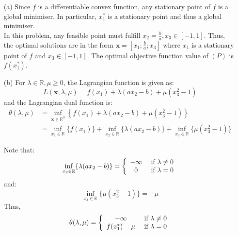 \documentclass{article}
\begin{document}
\begin{itemize}
    \item[(a)] Since $f$ is a differentiable convex function, any stationary point of $f$ is a global minimiser. In particular, $x_1^*$ is a stationary point and thus a global minimiser. \\
    In this problem, any feasible point must fulfill $x_2 = \frac ba, x_3 \in [-1,1]$. Thus, the optimal solutions are in the form $\mathbf{x} = \left[x_1; \frac ba; x_3\right]$ where $x_1$ is a stationary point of $f$ and $x_3\in[-1,1]$. The optimal objective function value of $(P)$ is $f(x_1^*)$.
    \item[(b)] For $\lambda \in \mathbb{R}, \mu\geq0$, the Lagrangian function is given as:\[L(\mathbf{x},\lambda,\mu) = f(x_1) + \lambda (ax_2 -b) + \mu(x_3^2-1)\] and the Lagrangian dual function is:\begin{align*}
        \theta(\lambda, \mu) &= \inf_{\mathbf{x}\in\mathbb{R}^3}\left\{ f(x_1) + \lambda (ax_2 -b) + \mu(x_3^2-1)\right\} \\ &=
        \inf_{x_1\in\mathbb{R}}\{f(x_1)\} +\inf_{x_2\in\mathbb{R}}\{\lambda (ax_2-b)\} +\inf_{x_3\in\mathbb{R}}\{\mu(x_3^2-1)\}  
    \end{align*}

Note that:
\[ \inf_{x_2\in\mathbb{R}}\{\lambda (ax_2-b)\} = \left\{ \begin{array}{c c}
     -\infty & \text{ if } \lambda\neq0 \\
     0 &  \text{ if } \lambda=0
\end{array}\right.
\]
and:
\[ \inf_{x_3\in\mathbb{R}}\{\mu (x_3^2-1)\} = -\mu
\]
Thus, \[
\theta(\lambda,\mu) = \left\{ \begin{array}{c c}
     -\infty & \text{ if } \lambda\neq0 \\
     f(x_1^*)-\mu &  \text{ if } \lambda=0
\end{array}\right.
\]


\end{itemize}
\end{document}
